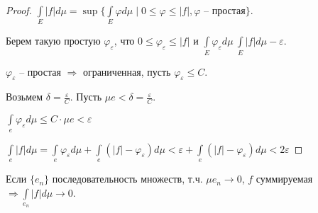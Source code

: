 \begin{proof}
    $\int\limits_E |f| d\mu=\sup\{\int\limits_E \varphi d\mu\mid 0 \leq \varphi \leq |f|,
    \varphi\text{ – простая}\}$.

    Берем такую простую $\varphi_\varepsilon$, что $0 \leq \varphi_\varepsilon \leq |f|$ и 
    $\int\limits_E \varphi_\varepsilon d\mu\> \int\limits_E |f| d\mu-\varepsilon$.

    $\varphi_\varepsilon$ – простая $\Rightarrow$ ограниченная, пусть $\varphi_\varepsilon\leq C$.

    Возьмем $\delta =\frac{\varepsilon}{C}$. Пусть $\mu e < \delta =\frac{\varepsilon}{C}$.

    $\int\limits_e\varphi_\varepsilon d\mu \leq C\cdot \mu e<\varepsilon$

    $\int\limits_e|f| d\mu=\int\limits_e\varphi_\varepsilon d\mu+
    \int\limits_e(|f|-\varphi_\varepsilon) d\mu<\varepsilon+\int\limits_e(|f|-\varphi_\varepsilon) d\mu
    <2\varepsilon$
\end{proof}

\begin{corollary}
    Если $\{e_n\}$ последовательность множеств, т.ч. $\mu e_n\rightarrow 0$,
    $f$ суммируемая $\Rightarrow \int\limits_{e_n} |f| d\mu\rightarrow 0$.
\end{corollary}